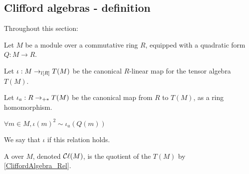\subsection{Clifford algebras - definition}
\label{sec:def}







Throughout this section:

Let $M$ be a module over a commutative ring $R$, equipped with a quadratic form $Q: M \to R$.

Let $\iota : M \lmap{R} T(M)$ be the canonical $R$-linear map for the tensor algebra $T(M)$.

Let $\iota_a : R \amap{R} T(M)$ be the canonical map from $R$ to $T(M)$, as a ring homomorphism.

\begin{definition}
  \label{CliffordAlgebra_Rel}

  $\forall m \in M, \iota(m)^2 \sim \iota_a(Q(m))$
\end{definition}

We say that $\iota$  if this relation holds.

\begin{definition}
    \label{CliffordAlgebra}

    A  over $M$, denoted $\Cl (M)$, is
    the quotient of the  $T(M)$
    by  \ref{CliffordAlgebra_Rel}.
\end{definition}

